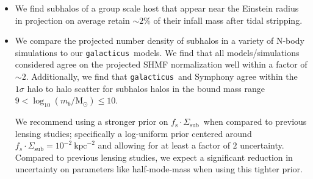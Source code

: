 \documentclass[%
 reprint,
 amsmath,
 amssymb,
 aps,
prd,
twocolumn,
superscriptaddress,
preprintnumbers,
floatfix,
nofootinbib
]{revtex4-2}
\def\gal{{\tt galacticus}~}
\def\symphony{Symphony }
\def\sigsub{{$\Sigma_{\mathrm{sub}}$}}
\def\fssigsub{{$f_{\mathrm{s}} \cdot \Sigma_{\mathrm{sub}}$}}
\begin{document}
\begin{itemize}
     For future lensing studies with group mass lenses, we find that the effects from a central galaxy have a negligible impact on the strength of tidal stripping experienced by subhalos and does not need to be considered when setting a prior \sigsub.
     

    \item 
    We find subhalos of a group scale host that appear near the Einstein radius in projection on average retain $\sim 2\%$ of their infall mass after tidal stripping. 


    \item 
    We compare the projected number density of subhalos in a variety of N-body simulations to our \gal models.
    We find that all models/simulations considered agree on the projected SHMF normalization well within a factor of $\sim 2$.
    Additionally, we find that \gal and \symphony agree within the $1 \sigma$ halo to halo scatter for subhalos halos in the bound  mass range $9 < \log_{10}(m_b/\mathrm{M}_\odot) \leq 10$.

    We recommend using a stronger prior on \fssigsub~when compared to previous lensing studies; specifically a log-uniform prior centered around $f_s \cdot \Sigma_{\mathrm{sub}} = 10^{-2} ~\text{kpc}^{-2}$ and allowing for at least a factor of $2$ uncertainty.
    Compared to previous lensing studies, we expect a significant reduction in uncertainty on parameters like half-mode-mass when using this tighter prior.



\end{itemize}
\end{document}

